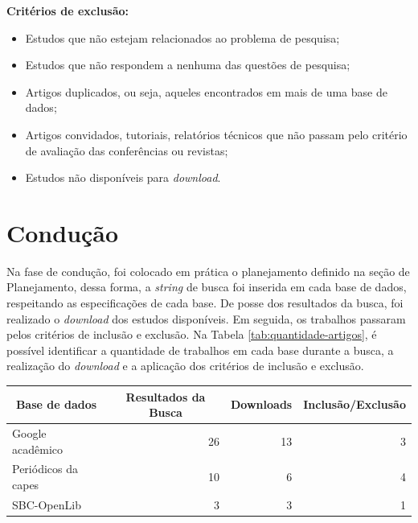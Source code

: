 \textbf{Critérios de exclusão: }
    \begin{itemize}
        \item Estudos que não estejam relacionados ao problema de pesquisa;
        \item Estudos que não respondem a nenhuma das questões de pesquisa;
        \item Artigos duplicados, ou seja, aqueles encontrados em mais de uma base de dados;
        \item Artigos convidados, tutoriais, relatórios técnicos que não passam pelo critério de avaliação das conferências ou revistas;
        \item Estudos não disponíveis para \textit{download}.
    \end{itemize}

\section{Condução}
Na fase de condução, foi colocado em prática o planejamento definido na seção de Planejamento, dessa forma, a \textit{string} de busca 
foi inserida em cada base de dados, respeitando as especificações de cada base. De posse dos resultados da busca, foi realizado 
o \textit{download} dos estudos disponíveis. Em seguida, os trabalhos passaram pelos critérios de inclusão e exclusão. 
Na Tabela \ref{tab:quantidade-artigos}, é possível identificar a quantidade de trabalhos em cada base durante a busca, 
a realização do \textit{download} e a aplicação dos critérios de inclusão e exclusão.

\begin{table}[h!]
\centering
{}
\begin{tabular}{@{}lrrr@{}}
\toprule
\multicolumn{1}{c}{\textbf{Base de dados}} & \multicolumn{1}{c}{\textbf{Resultados da Busca}} & \multicolumn{1}{c}{\textbf{Downloads}} & \multicolumn{1}{c}{\textbf{Inclusão/Exclusão}} \\ \midrule \midrule
Google acadêmico                           & 26                                               & 13                                     & 3                                              \\
Periódicos da capes                        & 10                                               & 6                                      & 4                                              \\
SBC-OpenLib                                & 3                                                & 3                                      & 1                                              \\ \bottomrule
\end{tabular}
\end{table}


